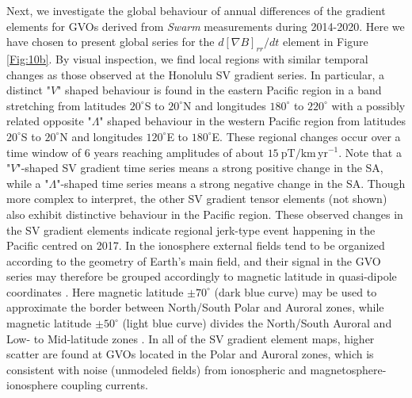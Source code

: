 \documentclass[extra,mreferee]{gji}
\begin{document}
Next, we investigate the global behaviour of annual differences of the gradient elements for GVOs derived from {\it Swarm} measurements during 2014-2020. Here we have chosen to present global series for the $d \left[\nabla B\right]_{rr}/dt$ element in Figure \ref{Fig:10b}. By visual inspection, we find local regions with similar temporal changes as those observed at the Honolulu SV gradient series. In particular, a distinct "$V$" shaped behaviour is found in the eastern Pacific region in a band stretching from latitudes $20^{\circ}$S to $20^{\circ}$N and longitudes $180^{\circ}$ to $220^{\circ}$ with a possibly related opposite "$\Lambda$" shaped behaviour in the western Pacific region from latitudes $20^{\circ}$S to $20^{\circ}$N and longitudes $120^{\circ}$E to $180^{\circ}$E. These regional changes occur over a time window of 6 years reaching amplitudes of about $15 \: \mathrm{pT}/\mathrm{km} \, \mathrm{yr}^{-1}$. Note that a "$V$"-shaped SV gradient time series means a strong positive change in the SA, while a "$\Lambda$"-shaped time series means a strong negative change in the SA. Though more complex to interpret, the other SV gradient tensor elements (not shown) also exhibit distinctive behaviour in the Pacific region. These observed changes in the SV gradient elements indicate regional jerk-type event happening in the Pacific centred on 2017. In the ionosphere external fields tend to be organized according to the geometry of Earth's main field, and their signal in the GVO series may therefore be grouped accordingly to magnetic latitude in quasi-dipole coordinates \citep{Laundal_Richmond_2017}. Here magnetic latitude $\pm70^{\circ}$ (dark blue curve) may be used to approximate the border between North/South Polar and Auroral zones, while magnetic latitude $\pm50^{\circ}$ (light blue curve) divides the North/South Auroral and Low- to Mid-latitude zones \citep{Hammer_etal_2021a}. In all of the SV gradient element maps, higher scatter are found at GVOs located in the Polar and Auroral zones, which is consistent with noise (unmodeled fields) from ionospheric and magnetosphere-ionosphere coupling currents. 
\end{document}
